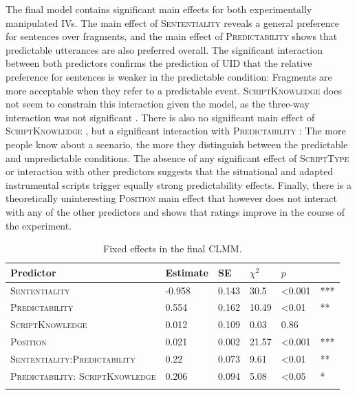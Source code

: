 The final model contains significant main effects for both experimentally manipulated IVs. The main effect of \textsc{Sententiality}  reveals a general preference for sentences over fragments, and the main effect of \textsc{Predictability}  shows that predictable utterances are also preferred overall. The significant interaction  between both predictors confirms the prediction of UID that the relative preference for sentences is weaker in the predictable condition: Fragments are more acceptable when they refer to a predictable event. \textsc{ScriptKnowledge} does not seem to constrain this interaction given the model, as the three-way interaction was not significant . There is also no significant main effect of \textsc{ScriptKnowledge} , but a significant interaction with \textsc{Predictability} : The more people know about a scenario, the more they distinguish between the predictable and unpredictable conditions. The absence of any significant effect of \textsc{ScriptType} or interaction with other predictors suggests that the situational and adapted instrumental scripts trigger equally strong predictability effects. Finally, there is a theoretically uninteresting \textsc{Position} main effect that however does not interact with any of the other predictors and shows that ratings improve in the course of the experiment.

\begin{table}
\centering
\caption{Fixed effects in the final CLMM. \label{tab:scripts-rating-estimates}}
\begin{tabular}{p{3.4cm}lllll}
\lsptoprule
Predictor & Estimate & SE & $\chi^2$ &  $p$ &  \\   
\midrule
\textsc{Sententiality}      &  -0.958 & 0.143 & 30.5 & \textless 0.001 & ***\\
\textsc{Predictability}    &   \phantom{-}0.554 &  0.162 & 10.49 & \textless 0.01 & ** \\
\textsc{ScriptKnowledge}    &  \phantom{-}0.012 &  0.109 & \phantom{1}0.03 & \phantom{\textless }0.86  &  \\
\textsc{Position}   & \phantom{-}0.021 & 0.002 & 21.57 & \textless 0.001 & *** \\
\textsc{Sententiality:}\linebreak \textsc{Predictability} &   \phantom{-}0.22 &  0.073  & \phantom{-}9.61 & \textless 0.01 & **\\
\textsc{Predictability:} \textsc{ScriptKnowledge}   &  \phantom{-}0.206 & 0.094 & \phantom{1}5.08  & \textless 0.05 & *\\
\lspbottomrule
\end{tabular}
\end{table}

